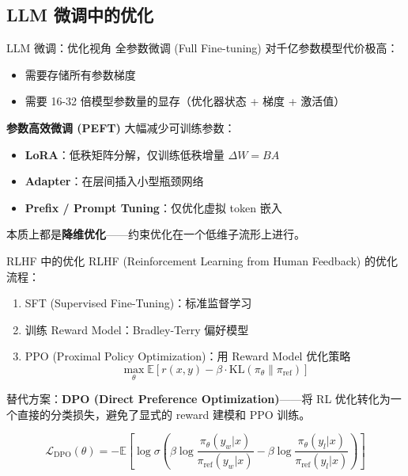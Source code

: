 \documentclass[11pt, aspectratio=169, svgnames, table, fontset=fandol]{ctexbeamer}
\newcommand{\E}{\mathbb{E}}
\begin{document}
\subsection{LLM 微调中的优化}

\begin{frame}{LLM 微调：优化视角}
  全参数微调 (Full Fine-tuning) 对千亿参数模型代价极高：
  \begin{itemize}
    \item 需要存储所有参数梯度
    \item 需要 16-32 倍模型参数量的显存（优化器状态 + 梯度 + 激活值）
  \end{itemize}

  \vspace{6pt}
  \textbf{参数高效微调 (PEFT)} 大幅减少可训练参数：
  \begin{itemize}
    \item \textbf{LoRA}：低秩矩阵分解，仅训练低秩增量 $\Delta W = BA$
    \item \textbf{Adapter}：在层间插入小型瓶颈网络
    \item \textbf{Prefix / Prompt Tuning}：仅优化虚拟 token 嵌入
  \end{itemize}

  本质上都是\textbf{降维优化}——约束优化在一个低维子流形上进行。
\end{frame}

\begin{frame}{RLHF 中的优化}
  RLHF (Reinforcement Learning from Human Feedback) 的优化流程：
  \begin{enumerate}
    \item SFT (Supervised Fine-Tuning)：标准监督学习
    \item 训练 Reward Model：Bradley-Terry 偏好模型
    \item PPO (Proximal Policy Optimization)：用 Reward Model 优化策略
      \begin{equation*}
        \max_\theta \E\left[ r(x,y) - \beta \cdot \text{KL}(\pi_\theta \parallel \pi_{\text{ref}}) \right]
      \end{equation*}
  \end{enumerate}

  \vspace{4pt}
  替代方案：\textbf{DPO (Direct Preference Optimization)}——将 RL 优化转化为一个直接的分类损失，避免了显式的 reward 建模和 PPO 训练。

  \begin{equation*}
    \mathcal{L}_{\text{DPO}}(\theta) = -\E \left[ \log \sigma \left( \beta \log \frac{\pi_\theta(y_w|x)}{\pi_{\text{ref}}(y_w|x)} - \beta \log \frac{\pi_\theta(y_l|x)}{\pi_{\text{ref}}(y_l|x)} \right) \right]
  \end{equation*}
\end{frame}
\end{document}

